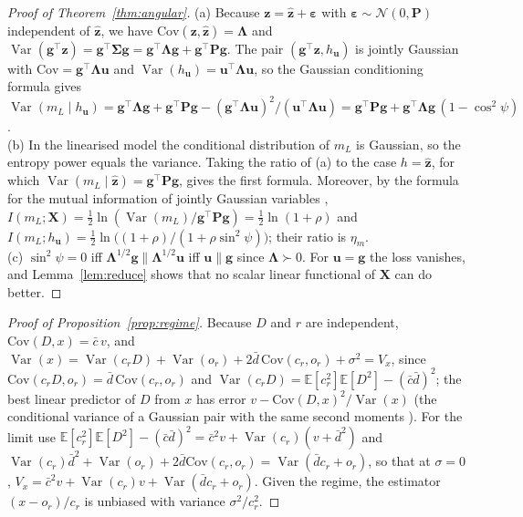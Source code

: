 \documentclass[preprint,12pt]{elsarticle}
\theoremstyle{definition}
\newcommand{\E}{\mathbb{E}}
\DeclareMathOperator{\Var}{Var}
\begin{document}
\begin{proof}[Proof of Theorem~\ref{thm:angular}]
(a) Because $\mathbf z=\hat{\mathbf z}+\boldsymbol\varepsilon$ with $\boldsymbol\varepsilon\sim\mathcal N(0,\mathbf P)$ independent of $\hat{\mathbf z}$, we have $\mathrm{Cov}(\mathbf z,\hat{\mathbf z})=\boldsymbol\Lambda$ and $\Var(\mathbf g^\top\mathbf z)=\mathbf g^\top\boldsymbol\Sigma\mathbf g=\mathbf g^\top\boldsymbol\Lambda\mathbf g+\mathbf g^\top\mathbf P\mathbf g$. The pair $(\mathbf g^\top\mathbf z,h_{\mathbf u})$ is jointly Gaussian with $\mathrm{Cov}=\mathbf g^\top\boldsymbol\Lambda\mathbf u$ and $\Var(h_{\mathbf u})=\mathbf u^\top\boldsymbol\Lambda\mathbf u$, so the Gaussian conditioning formula \cite[Sect.~2.3]{bishop2006} gives
$\Var(m_L\mid h_{\mathbf u})=\mathbf g^\top\boldsymbol\Lambda\mathbf g+\mathbf g^\top\mathbf P\mathbf g-(\mathbf g^\top\boldsymbol\Lambda\mathbf u)^2/(\mathbf u^\top\boldsymbol\Lambda\mathbf u)=\mathbf g^\top\mathbf P\mathbf g+\mathbf g^\top\boldsymbol\Lambda\mathbf g\,(1-\cos^2\psi)$.\\
(b) In the linearised model the conditional distribution of $m_L$ is Gaussian, so the entropy power equals the variance. Taking the ratio of (a) to the case $h=\hat{\mathbf z}$, for which $\Var(m_L\mid\hat{\mathbf z})=\mathbf g^\top\mathbf P\mathbf g$, gives the first formula. Moreover, by the formula for the mutual information of jointly Gaussian variables \cite[Chap.~8]{cover2006}, $I(m_L;\mathbf{X})=\tfrac12\ln(\Var(m_L)/\mathbf g^\top\mathbf P\mathbf g)=\tfrac12\ln(1+\rho)$ and $I(m_L;h_{\mathbf u})=\tfrac12\ln\big((1+\rho)/(1+\rho\sin^2\psi)\big)$; their ratio is $\eta_m$.\\
(c) $\sin^2\psi=0$ iff $\boldsymbol\Lambda^{1/2}\mathbf g\parallel\boldsymbol\Lambda^{1/2}\mathbf u$ iff $\mathbf u\parallel\mathbf g$ since $\boldsymbol\Lambda\succ0$. For $\mathbf u=\mathbf g$ the loss vanishes, and Lemma~\ref{lem:reduce} shows that no scalar linear functional of $\mathbf{X}$ can do better.
\end{proof}

\begin{proof}[Proof of Proposition~\ref{prop:regime}]
Because $D$ and $r$ are independent, $\mathrm{Cov}(D,x)=\bar c\,v$, and $\Var(x)=\Var(c_rD)+\Var(o_r)+2\bar d\,\mathrm{Cov}(c_r,o_r)+\sigma^2=V_x$, since $\mathrm{Cov}(c_rD,o_r)=\bar d\,\mathrm{Cov}(c_r,o_r)$ and $\Var(c_rD)=\E[c_r^2]\E[D^2]-(\bar c\bar d)^2$; the best linear predictor of $D$ from $x$ has error $v-\mathrm{Cov}(D,x)^2/\Var(x)$ (the conditional variance of a Gaussian pair with the same second moments \cite[Sect.~2.3]{bishop2006}). For the limit use $\E[c_r^2]\E[D^2]-(\bar c\bar d)^2=\bar c^2v+\Var(c_r)(v+\bar d^2)$ and $\Var(c_r)\bar d^2+\Var(o_r)+2\bar d\mathrm{Cov}(c_r,o_r)=\Var(\bar d c_r+o_r)$, so that at $\sigma=0$, $V_x=\bar c^2v+\Var(c_r)v+\Var(\bar d c_r+o_r)$. Given the regime, the estimator $(x-o_r)/c_r$ is unbiased with variance $\sigma^2/c_r^2$.
\end{proof}
\end{document}
